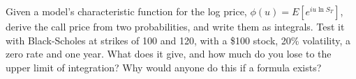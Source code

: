 \begin{question}\label{iq:iv2:pricing-and-numerics:50}
Given a model's characteristic function for the log price, $\phi(u) = E[e^{iu\ln S_T}]$, derive the call price from two probabilities, and write them as integrals. Test it with Black-Scholes at strikes of 100 and 120, with a \$100 stock, 20\% volatility, a zero rate and one year. What does it give, and how much do you lose to the upper limit of integration? Why would anyone do this if a formula exists?
\end{question}
